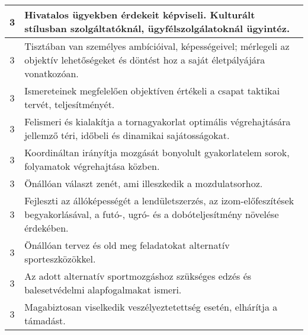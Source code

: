 \begin{longtable}{c | p{12cm} }
                                
                                          3 &  Hivatalos ügyekben érdekeit képviseli. Kulturált stílusban szolgáltatóknál, ügyfélszolgálatoknál ügyintéz. \\ \hline
                                          3 &  Tisztában van személyes ambícióival, képességeivel; mérlegeli az objektív lehetőségeket és döntést hoz a saját életpályájára vonatkozóan. \\ \hline
                                          3 &  Ismereteinek megfelelően objektíven értékeli a csapat taktikai tervét, teljesítményét. \\ \hline
                                          3 &  Felismeri és kialakítja a tornagyakorlat optimális végrehajtására jellemző téri, időbeli és dinamikai sajátosságokat. \\ \hline
                                          3 &  Koordináltan irányítja mozgását bonyolult gyakorlatelem sorok, folyamatok végrehajtása közben. \\ \hline
                                          3 &  Önállóan választ zenét, ami illeszkedik a mozdulatsorhoz. \\ \hline
                                          3 &  Fejleszti az állóképességét a lendületszerzés, az izom-előfeszítések begyakorlásával, a futó-, ugró- és a dobóteljesítmény növelése érdekében. \\ \hline
                                          3 &  Önállóan tervez  és old meg feladatokat alternatív sporteszközökkel. \\ \hline
                                          3 &  Az adott alternatív sportmozgáshoz szükséges edzés és balesetvédelmi alapfogalmakat ismeri. \\ \hline
                                          3 &  Magabiztosan viselkedik veszélyeztetettség esetén, elhárítja a támadást. \\ \hline
                                      

\end{longtable}
